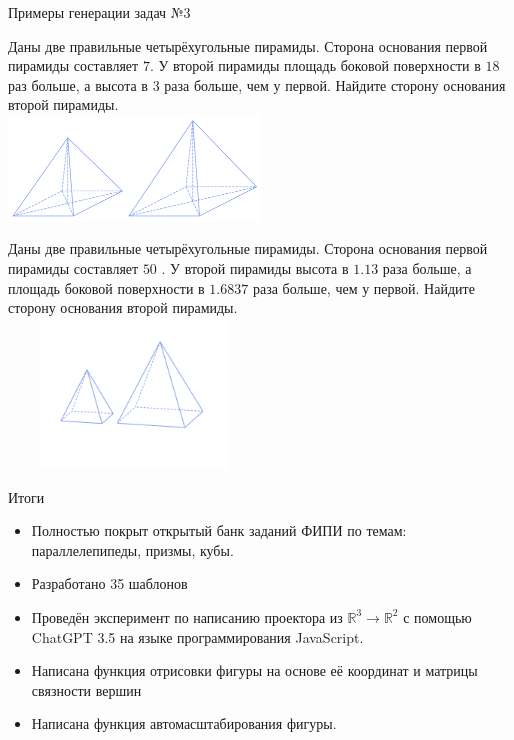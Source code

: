\documentclass[aspectratio=169,12pt]{beamer}
\begin{document}
\begin{frame}{Примеры генерации задач №3}
	\begin{multicols}{2}
		\footnotesize
		Даны две правильные четырёхугольные пирамиды. Сторона основания первой пирамиды составляет $7$. У второй пирамиды площадь боковой поверхности в $18$ раз больше, а высота в $3$ раза больше, чем у первой. Найдите сторону основания второй пирамиды.\\

		\includegraphics[width=0.5\textwidth]{images/5}\\
		\vfill\null
		\columnbreak

		Даны две правильные четырёхугольные пирамиды. Сторона основания первой пирамиды составляет $50$ . У второй пирамиды высота в $1.13$  раза больше, а площадь боковой поверхности в $1.6837$  раза больше, чем у первой. Найдите сторону основания второй пирамиды.\\

		\includegraphics[width=0.5\textwidth,height=4cm]{images/6}\\

	\end{multicols}
\end{frame}

\begin{frame}{Итоги}
	\begin{itemize}
		\item Полностью покрыт открытый банк заданий ФИПИ по темам: параллелепипеды, призмы, кубы.
		\item Разработано 35 шаблонов
		\item Проведён эксперимент по написанию проектора из $\mathbb{R}^3 \to \mathbb{R}^2$ с помощью ChatGPT 3.5 на языке программирования JavaScript.
		\item Написана функция отрисовки фигуры на основе её координат и матрицы связности вершин
		\item Написана функция автомасштабирования фигуры.
	\end{itemize}

\end{frame}
\end{document}
